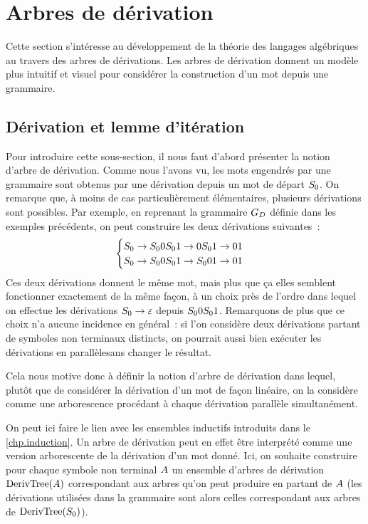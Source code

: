 \section{Arbres de dérivation}

Cette section s'intéresse au développement de la théorie des langages
algébriques au travers des arbres de dérivations. Les
arbres de dérivation donnent un modèle plus intuitif et visuel pour considérer
la construction d'un mot depuis une grammaire.

\subsection{Dérivation et lemme d'itération}

Pour introduire cette sous-section, il nous faut d'abord présenter la notion
d'arbre de dérivation. Comme nous l'avons vu, les mots engendrés par une
grammaire sont obtenus par une dérivation depuis un mot de départ $S_{0}$. On
remarque que, à moins de cas particulièrement élémentaires, plusieurs
dérivations sont possibles. Par exemple, en reprenant la grammaire $G_D$
définie dans les exemples précédents, on peut construire les deux dérivations
suivantes~:
\[\begin{cases}
S_{0} \to S_{0} 0S_{0} 1 \to 0S_{0} 1 \to 01\\
S_{0} \to S_{0} 0S_{0}1 \to S_{0} 01 \to 01
\end{cases}\]
Ces deux dérivations donnent le même mot, mais plus que ça elles semblent
fonctionner exactement de la même façon, à un choix près de l'ordre dans
lequel on effectue les dérivations $S_{0} \to \varepsilon$ depuis $S_{0} 0S_{0} 1$.
Remarquons de plus que ce choix n'a aucune incidence en général~: si l'on
considère deux dérivations partant de symboles non terminaux distincts, on
pourrait aussi bien exécuter les dérivations \og en parallèle\fg sans changer le
résultat.

Cela nous motive donc à définir la notion d'arbre de dérivation dans lequel,
plutôt que de considérer la dérivation d'un mot de façon linéaire, on la
considère comme une arborescence procédant à chaque dérivation parallèle
simultanément.

On peut ici faire le lien avec les ensembles inductifs introduits dans le
\cref{chp.induction}. Un arbre de dérivation peut en effet être interprété
comme une version arborescente de la dérivation d'un mot donné. Ici,
on souhaite construire pour chaque symbole non terminal $A$ un ensemble
d'arbres de dérivation $\operatorname{DerivTree}(A)$ correspondant aux arbres qu'on peut
produire en partant de $A$ (les dérivations utilisées dans la grammaire sont
alors celles correspondant aux arbres de $\operatorname{DerivTree}(S_{0})$).

